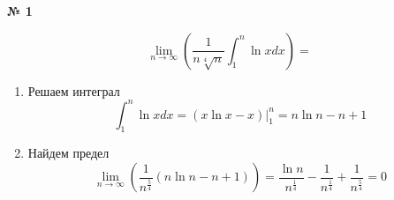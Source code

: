 \documentclass{article}
\begin{document}
\textbf{№ 1} 

\begingroup
\Large

$$ \lim\limits_{n\to \infty} \left( \frac{1}{n \sqrt[4]{n}} \int_{1}^{n} \ln{x} dx \right)
= $$

\begin{enumerate}
\item Решаем интеграл
$$  \int_{1}^{n} \ln{x} dx
= \left( x\ln{x} - x\right)  \bigg\rvert_{1}^{n}
= n\ln{n} - n + 1$$

\item Найдем предел
$$ \lim\limits_{n\to \infty} \left( \frac{1}{n^{\frac{5}{4}}} (n\ln{n} - n + 1) \right)
= \frac{\ln{n}}{n^{\frac{1}{4}}} - \frac{1}{n^{\frac{1}{4}}} + \frac{1}{n^{\frac{5}{4}}} 
= 0$$

\end{enumerate}
\endgroup
\end{document}
